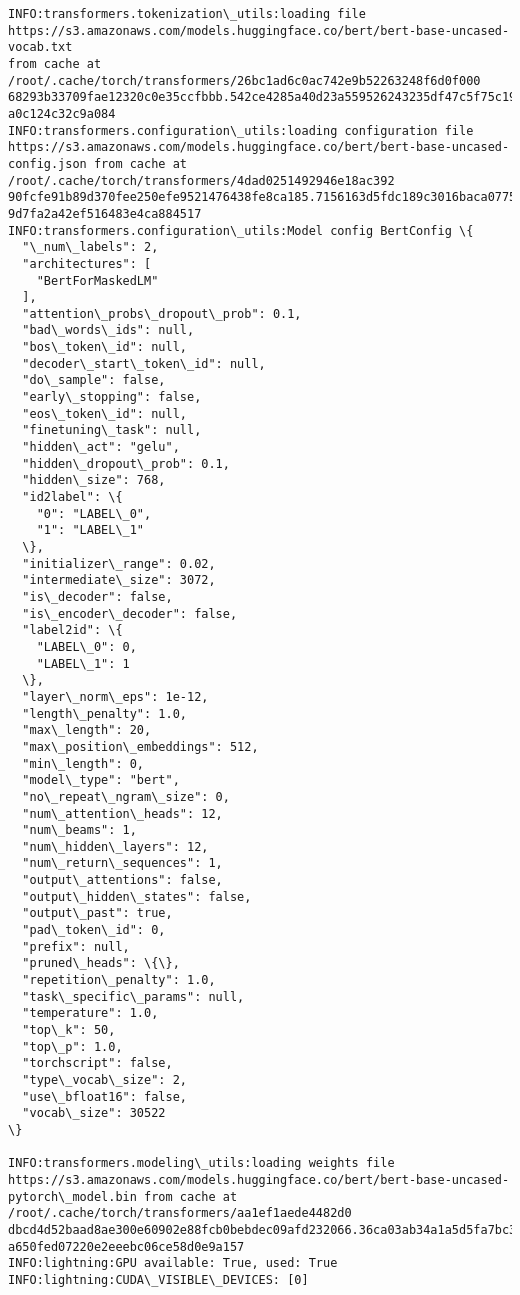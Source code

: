 \documentclass[10pt]{article}
\begin{document}
    \begin{Verbatim}[commandchars=\\\{\}]
INFO:transformers.tokenization\_utils:loading file
https://s3.amazonaws.com/models.huggingface.co/bert/bert-base-uncased-vocab.txt
from cache at /root/.cache/torch/transformers/26bc1ad6c0ac742e9b52263248f6d0f000
68293b33709fae12320c0e35ccfbbb.542ce4285a40d23a559526243235df47c5f75c197f04f37d1
a0c124c32c9a084
INFO:transformers.configuration\_utils:loading configuration file
https://s3.amazonaws.com/models.huggingface.co/bert/bert-base-uncased-
config.json from cache at /root/.cache/torch/transformers/4dad0251492946e18ac392
90fcfe91b89d370fee250efe9521476438fe8ca185.7156163d5fdc189c3016baca0775ffce23078
9d7fa2a42ef516483e4ca884517
INFO:transformers.configuration\_utils:Model config BertConfig \{
  "\_num\_labels": 2,
  "architectures": [
    "BertForMaskedLM"
  ],
  "attention\_probs\_dropout\_prob": 0.1,
  "bad\_words\_ids": null,
  "bos\_token\_id": null,
  "decoder\_start\_token\_id": null,
  "do\_sample": false,
  "early\_stopping": false,
  "eos\_token\_id": null,
  "finetuning\_task": null,
  "hidden\_act": "gelu",
  "hidden\_dropout\_prob": 0.1,
  "hidden\_size": 768,
  "id2label": \{
    "0": "LABEL\_0",
    "1": "LABEL\_1"
  \},
  "initializer\_range": 0.02,
  "intermediate\_size": 3072,
  "is\_decoder": false,
  "is\_encoder\_decoder": false,
  "label2id": \{
    "LABEL\_0": 0,
    "LABEL\_1": 1
  \},
  "layer\_norm\_eps": 1e-12,
  "length\_penalty": 1.0,
  "max\_length": 20,
  "max\_position\_embeddings": 512,
  "min\_length": 0,
  "model\_type": "bert",
  "no\_repeat\_ngram\_size": 0,
  "num\_attention\_heads": 12,
  "num\_beams": 1,
  "num\_hidden\_layers": 12,
  "num\_return\_sequences": 1,
  "output\_attentions": false,
  "output\_hidden\_states": false,
  "output\_past": true,
  "pad\_token\_id": 0,
  "prefix": null,
  "pruned\_heads": \{\},
  "repetition\_penalty": 1.0,
  "task\_specific\_params": null,
  "temperature": 1.0,
  "top\_k": 50,
  "top\_p": 1.0,
  "torchscript": false,
  "type\_vocab\_size": 2,
  "use\_bfloat16": false,
  "vocab\_size": 30522
\}

INFO:transformers.modeling\_utils:loading weights file
https://s3.amazonaws.com/models.huggingface.co/bert/bert-base-uncased-
pytorch\_model.bin from cache at /root/.cache/torch/transformers/aa1ef1aede4482d0
dbcd4d52baad8ae300e60902e88fcb0bebdec09afd232066.36ca03ab34a1a5d5fa7bc3d03d55c4f
a650fed07220e2eeebc06ce58d0e9a157
INFO:lightning:GPU available: True, used: True
INFO:lightning:CUDA\_VISIBLE\_DEVICES: [0]
    \end{Verbatim}
\end{document}
